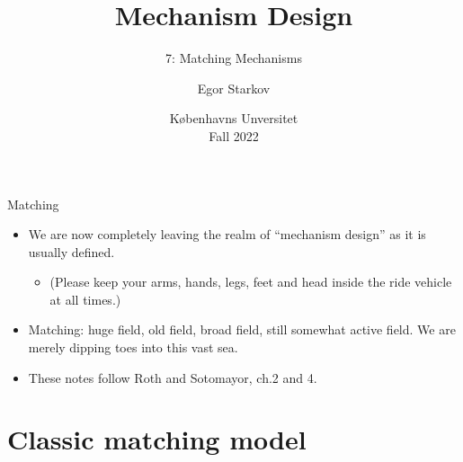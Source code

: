 \documentclass[english,10pt
,aspectratio=169
]{beamer}
\title{Mechanism Design}
\subtitle{7: Matching Mechanisms}
\author{Egor Starkov}
\date{K{\o}benhavns Unversitet \\
	Fall 2022}
\begin{document}
	\frame[plain]{\titlepage}


\begin{frame}{Matching}
\begin{itemize}
	\item We are now completely leaving the realm of ``mechanism design'' as it is usually defined.
	\begin{itemize}
		\item (Please keep your arms, hands, legs, feet and head inside the ride vehicle at all times.)
	\end{itemize}
	\item Matching: huge field, old field, broad field, still somewhat active field. We are merely dipping toes into this vast sea.
	\item These notes follow Roth and Sotomayor, ch.2 and 4.
\end{itemize}
\end{frame}


\section{Classic matching model}
\end{document}
